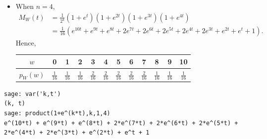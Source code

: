 \begin{frame}[fragile]
\begin{itemize}
	\item[] When $n=4$,
	 \begin{align*}
		M_W(t) & = \frac{1}{2^4} \left(1+e^t\right)\left(1+e^{2t}\right)\left(1+e^{3t}\right)\left(1+e^{4t}\right)\\
           & = \frac{1}{16} \left( e^{10t} + e^{9t} + e^{8t} + 2e^{7t} + 2e^{6t} + 2e^{5t} + 2e^{4t} + 2e^{3t} + e^{2t} + e^t + 1\right).
	\end{align*}
	Hence,
	\begin{center}
		\renewcommand{\arraystretch}{1.5}
		\begin{tabular}{|c|c|c|c|c|c|c|c|c|c|c|c|}
			$w$      & 0              & 1              & 2              & 3              & 4              & 5              & 6              & 7              & 8              & 9              & 10             \\ \hline \bigskip
			$p_W(w)$ & $\frac{1}{16}$ & $\frac{1}{16}$ & $\frac{1}{16}$ & $\frac{2}{16}$ & $\frac{2}{16}$ & $\frac{2}{16}$ & $\frac{2}{16}$ & $\frac{2}{16}$ & $\frac{1}{16}$ & $\frac{1}{16}$ & $\frac{1}{16}$ \\
		\end{tabular}
	\end{center}
	\myQED
\end{itemize}
\vfill
\mySeparateLine
\begin{lstlisting}
sage: var('k,t')
(k, t)
sage: product(1+e^(k*t),k,1,4)
e^(10*t) + e^(9*t) + e^(8*t) + 2*e^(7*t) + 2*e^(6*t) + 2*e^(5*t) + 2*e^(4*t) + 2*e^(3*t) + e^(2*t) + e^t + 1
\end{lstlisting}
%
%
%
%
%
%
%
%
\end{frame}
